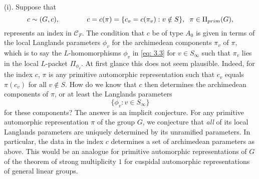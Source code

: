 \documentclass[preprint,12pt, leqno]{elsarticle}
\newcommand{\cC}{\mathcal{C}}
\newcommand{\ubf}[1]{\textit{#1}}
\newcommand{\SP}{\mkern70mu }
\numberwithin{equation}{section}
\theoremstyle{named}
\begin{document}
(i). Suppose that
\begin{equation*}
    c\sim (G, c), \SP c = c(\pi) = \{c_v = c(\pi_v) : v\notin S\},\;\; \pi\in\Pi_{prim}(G),
\end{equation*}
represents an index in $\cC_F$. The condition that $c$ be of type $A_0$ is given in terms of the local Langlands parameters $\phi_v$ for the archimedean components $\pi_v$ of $\pi$, which is to say the $L$-homomorphisms $\phi_v$ in \eqref{eq: 3.3} for $v\in S_{\infty}$ such that $\pi_v$ lies in the local $L$-packet $\Pi_{\phi_v}$. At first glance this does not seem plausible. Indeed, for the index $c$, $\pi$ is any primitive automorphic representation such that $c_v$ equals $\pi(c_v)$ for all $v\notin S$. How do we know that $c$ then determines the archimedean components of $\pi$, or at least the Langlands parameters
\begin{equation*}
    \{\phi_v : v\in S_{\infty}\}
\end{equation*}
for these components? The answer is an implicit conjecture. For any primitive automorphic representation $\pi$ of the group $G$, we conjecture that \ubf{all} of its local Langlands parameters are uniquely determined by its unramified parameters. In particular, the data in the index $c$ determines a set of archimedean parameters as above. This would be an analogue for primitive automorphic representations of $G$ of the theorem of strong multiplicity $1$ for cuspidal automorphic representations of general linear groups.
\end{document}
